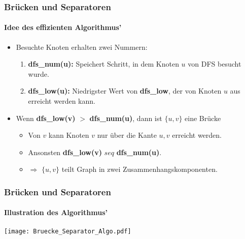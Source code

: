 \begin{frame}
		\frametitle{Brücken und Separatoren}
		\framesubtitle{Idee des effizienten Algorithmus'}
	\begin{itemize}
	\item Besuchte Knoten erhalten zwei Nummern:
	\begin{enumerate}
		\item \textbf{dfs\_num(u):} Speichert Schritt, in dem Knoten $u$ von DFS besucht wurde.
		\item \textbf{dfs\_low(u):} Niedrigster Wert von \textbf{dfs\_low}, der von Knoten $u$ aus erreicht werden kann. 
	\end{enumerate}
	\pause
	\item Wenn \textbf{dfs\_low(v)} $>$ \textbf{dfs\_num(u)}, dann ist $\{u,v\}$ eine Brücke
	\begin{itemize}
		\item Von $v$ kann Knoten $v$ nur über die Kante ${u,v}$ erreicht werden.
		\item Ansonsten \textbf{dfs\_low(v)} $seq$ \textbf{dfs\_num(u)}.
		\item $\Rightarrow$ $\{u,v\}$ teilt Graph in zwei Zusammenhangskomponenten.
	\end{itemize} 
\end{itemize}
\end{frame}
\begin{frame}
	\frametitle{Brücken und Separatoren}
	\framesubtitle{Illustration des Algorithmus'}
	\texttt{[image: Bruecke\_Separator\_Algo.pdf]}
\end{frame}